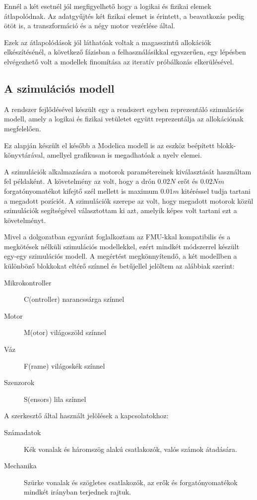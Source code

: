     Ennél a két esetnél jól megfigyelhető hogy a logikai és fizikai elemek átlapolódnak. Az adatgyűjtés két fizikai elemet is érintett, a beavatkozás pedig ötöt is, a transzformáció és a négy motor vezérlése által.
    
    Ezek az átlapolódások jól láthatóak voltak a magasszintű allokációk elkészítésénél, a következő fázisban a felhasználásikkal egyszerűen, egy lépésben elvégezhető volt a modellek finomítása az iteratív próbálkozás elkerülésével.


    \subsection{A szimulációs modell}
    A rendszer fejlődésével készült egy a rendszert egyben reprezentáló szimulációs modell, amely a logikai és fizikai vetületet együtt reprezentálja az allokációnak megfelelően.
    
    Ez alapján készült el később a Modelica modell is az eszköz beépített blokk-könyvtárával, amellyel grafikusan is megadhatóak a nyelv elemei.
    
    A szimulációk alkalmazására a motorok paramétereinek kiválasztását használtam fel példaként. A követelmény az volt, hogy a drón $0.02N$ erőt és $0.02Nm$ forgatónyomatékot kifejtő szél mellett is maximum $0.01m$ kitéréssel tudja tartani a megadott pozíciót.
    A szimulációk szerepe az volt, hogy megadott motorok közül szimulációk segítségével választottam ki azt, amelyik képes volt tartani ezt a követelményt.

    Mivel a dolgozatban egyaránt foglalkoztam az FMU-kkal kompatibilis és a megkötések nélküli szimulációs modellekkel, ezért mindkét módszerrel készült egy-egy szimulációs modell.
    A megértést megkönnyítendő, a két modellben a különböző blokkokat eltérő színnel és betűjellel jelöltem az alábbiak szerint:

    \begin{description}
        \item[Mikrokontroller] C(ontroller) narancssárga színnel
        \item[Motor] M(otor) világoszöld színnel
        \item[Váz] F(rame) világoskék színnel
        \item[Szenzorok] S(ensors) lila színnel
    \end{description}

    A szerkesztő által használt jelölések a kapcsolatokhoz:

    \begin{description}
        \item[Számadatok] Kék vonalak és háromszög alakú csatlakozók, valós számok átadására.
        \item[Mechanika] Szürke vonalak és szögletes csatlakozók, az erők és forgatónyomatékok mindkét irányban terjednek rajtuk.
    \end{description}

